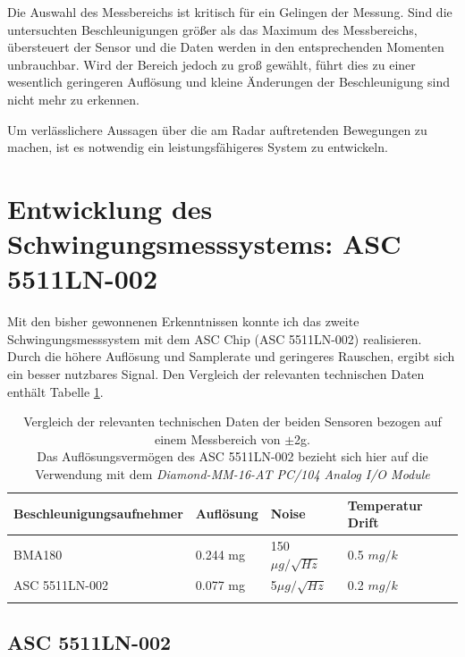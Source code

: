 \documentclass[12pt,a4paper,twoside,BCOR=12.5mm]{scrartcl}
\begin{document}
Die Auswahl des Messbereichs ist kritisch für ein Gelingen der Messung. Sind die untersuchten Beschleunigungen größer als das Maximum des Messbereichs, übersteuert der Sensor und die Daten werden in den entsprechenden Momenten unbrauchbar. Wird der Bereich jedoch zu groß gewählt, führt dies zu einer wesentlich geringeren Auflösung und kleine Änderungen der Beschleunigung sind nicht mehr zu erkennen.

Um verlässlichere Aussagen über die am Radar auftretenden Bewegungen zu machen, ist es notwendig ein leistungsfähigeres System zu entwickeln.






\newpage
\section{Entwicklung des Schwingungsmesssystems: ASC 5511LN-002}


Mit den bisher gewonnenen Erkenntnissen konnte ich das zweite Schwingungsmesssystem mit dem ASC Chip (ASC 5511LN-002) realisieren. Durch die höhere Auflösung und Samplerate und geringeres Rauschen, ergibt sich ein besser nutzbares Signal. Den Vergleich der relevanten technischen Daten enthält Tabelle \ref{sensorcompare}.

\begin{table}[ht]
\begin{tabular}{@{}llll@{}}    
      			\cmidrule(r){1-4}\morecmidrules\cmidrule(r){1-4}
       			Beschleunigungsaufnehmer & Auflösung & Noise & Temperatur Drift\\
      			\midrule
 			BMA180 				   & 0.244 mg  & 150$\mu g / \sqrt{Hz}$ & 0.5 $mg/k$ \\ 
 			ASC 5511LN-002 		   & 0.077 mg  &    5$\mu g / \sqrt{Hz}$  & 0.2 $mg/k$\\
 		
   			\addlinespace
   			\bottomrule
 \end{tabular}
 \caption{Vergleich der relevanten technischen Daten der beiden Sensoren bezogen auf einem Messbereich von $\pm$2g.\\ Das Auflösungsvermögen des ASC 5511LN-002 bezieht sich hier auf die Verwendung mit  dem \textit{Diamond-MM-16-AT PC/104 Analog I/O Module}}
 \label{sensorcompare}
\end{table}

\subsection{ASC 5511LN-002}
\end{document}
